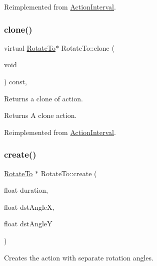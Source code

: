 Reimplemented from \hyperlink{classActionInterval_abc93ce0c2f54a90eb216a7803f25f44a}{Action\+Interval}.

\mbox{\label{classRotateTo_abab0b58d6ee4fa4684c6847f251edc6b}} 
\subsubsection{\texorpdfstring{clone()}{clone()}\hspace{0.1cm}{\footnotesize\ttfamily [2/2]}}
{\footnotesize\ttfamily virtual \hyperlink{classRotateTo}{Rotate\+To}$\ast$ Rotate\+To\+::clone (\begin{DoxyParamCaption}\item[{void}]{ }\end{DoxyParamCaption}) const\hspace{0.3cm}{\ttfamily [override]}, {\ttfamily [virtual]}}

Returns a clone of action.

\begin{DoxyReturn}{Returns}
A clone action. 
\end{DoxyReturn}


Reimplemented from \hyperlink{classActionInterval_abc93ce0c2f54a90eb216a7803f25f44a}{Action\+Interval}.

\mbox{\label{classRotateTo_a3a686ec57d37904ce567532b5c402706}} 
\subsubsection{\texorpdfstring{create()}{create()}\hspace{0.1cm}{\footnotesize\ttfamily [1/6]}}
{\footnotesize\ttfamily \hyperlink{classRotateTo}{Rotate\+To} $\ast$ Rotate\+To\+::create (\begin{DoxyParamCaption}\item[{float}]{duration,  }\item[{float}]{dst\+AngleX,  }\item[{float}]{dst\+AngleY }\end{DoxyParamCaption})\hspace{0.3cm}{\ttfamily [static]}}

Creates the action with separate rotation angles.


